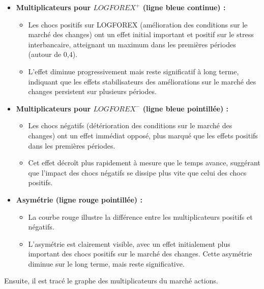 \begin{itemize}
    \item \textbf{Multiplicateurs pour $LOGFOREX^+$ (ligne bleue continue) :}
    \begin{itemize}
        \item Les chocs positifs sur LOGFOREX (amélioration des conditions sur le marché des changes) ont un effet initial important et positif sur le stress interbancaire, atteignant un maximum dans les premières périodes (autour de 0,4).
        \item L’effet diminue progressivement mais reste significatif à long terme, indiquant que les effets stabilisateurs des améliorations sur le marché des changes persistent sur plusieurs périodes.
    \end{itemize}

    \item \textbf{Multiplicateurs pour $LOGFOREX^-$ (ligne bleue pointillée) :}
    \begin{itemize}
        \item Les chocs négatifs (détérioration des conditions sur le marché des changes) ont un effet immédiat opposé, plus marqué que les effets positifs dans les premières périodes.
        \item Cet effet décroît plus rapidement à mesure que le temps avance, suggérant que l’impact des chocs négatifs se dissipe plus vite que celui des chocs positifs.
    \end{itemize}

    \item \textbf{Asymétrie (ligne rouge pointillée) :}
    \begin{itemize}
        \item La courbe rouge illustre la différence entre les multiplicateurs positifs et négatifs.
        \item L’asymétrie est clairement visible, avec un effet initialement plus important des chocs positifs sur le marché des changes. Cette asymétrie diminue sur le long terme, mais reste significative.
    \end{itemize}
\end{itemize}

Ensuite, il est tracé le graphe des multiplicateurs du marché actions.

